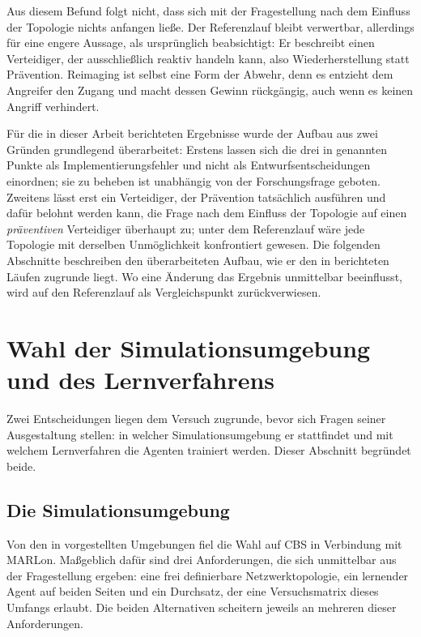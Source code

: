 Aus diesem Befund folgt nicht, dass sich mit der Fragestellung nach dem
Einfluss der Topologie nichts anfangen ließe. Der Referenzlauf bleibt
verwertbar, allerdings für eine engere Aussage, als ursprünglich
beabsichtigt: Er beschreibt einen Verteidiger, der ausschließlich reaktiv
handeln kann, also Wiederherstellung statt Prävention. Reimaging ist selbst
eine Form der Abwehr, denn es entzieht dem Angreifer den Zugang und macht
dessen Gewinn rückgängig, auch wenn es keinen Angriff verhindert.

Für die in dieser Arbeit berichteten Ergebnisse wurde der Aufbau aus zwei Gründen
grundlegend überarbeitet: Erstens lassen sich die drei in
 genannten Punkte als Implementierungsfehler und nicht
als Entwurfsentscheidungen einordnen; sie zu beheben ist unabhängig von der
Forschungsfrage geboten. Zweitens lässt erst ein Verteidiger, der Prävention
tatsächlich ausführen und dafür belohnt werden kann, die Frage nach dem
Einfluss der Topologie auf einen \emph{präventiven} Verteidiger überhaupt
zu; unter dem Referenzlauf wäre jede Topologie mit derselben Unmöglichkeit
konfrontiert gewesen. Die folgenden Abschnitte beschreiben den überarbeiteten
Aufbau, wie er den in  berichteten Läufen zugrunde liegt.
Wo eine Änderung das Ergebnis unmittelbar beeinflusst, wird auf den Referenzlauf
als Vergleichspunkt zurückverwiesen.

\section{Wahl der Simulationsumgebung und des Lernverfahrens}
\label{sec:umgebungswahl}

Zwei Entscheidungen liegen dem Versuch zugrunde, bevor sich Fragen seiner
Ausgestaltung stellen: in welcher Simulationsumgebung er stattfindet und
mit welchem Lernverfahren die Agenten trainiert werden. Dieser Abschnitt
begründet beide.

\subsection{Die Simulationsumgebung}

Von den in  vorgestellten Umgebungen fiel die Wahl auf \ac{CBS} in Verbindung mit MARLon. Maßgeblich dafür sind drei
Anforderungen, die sich unmittelbar aus der Fragestellung ergeben: eine frei
definierbare Netzwerktopologie, ein lernender Agent auf beiden Seiten und ein
Durchsatz, der eine Versuchsmatrix dieses Umfangs erlaubt. Die beiden
Alternativen scheitern jeweils an mehreren dieser Anforderungen.

